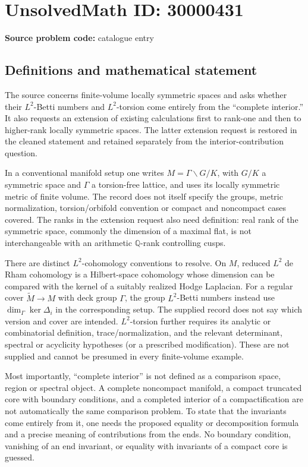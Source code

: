 \documentclass[11pt]{article}
\newcommand{\Q}{\mathbb{Q}}
\begin{document}
\section*{UnsolvedMath ID: 30000431}
\textbf{Source problem code:} catalogue entry
\subsection{Definitions and mathematical statement}
The source concerns finite-volume locally symmetric spaces and asks whether their \(L^2\)-Betti numbers and \(L^2\)-torsion come entirely from the ``complete interior.'' It also requests an extension of existing calculations first to rank-one and then to higher-rank locally symmetric spaces. The latter extension request is restored in the cleaned statement and retained separately from the interior-contribution question.

In a conventional manifold setup one writes \(M=\Gamma\backslash G/K\), with \(G/K\) a symmetric space and \(\Gamma\) a torsion-free lattice, and uses its locally symmetric metric of finite volume. The record does not itself specify the groups, metric normalization, torsion/orbifold convention or compact and noncompact cases covered. The ranks in the extension request also need definition: real rank of the symmetric space, commonly the dimension of a maximal flat, is not interchangeable with an arithmetic \(\Q\)-rank controlling cusps.

There are distinct \(L^2\)-cohomology conventions to resolve. On \(M\), reduced \(L^2\) de Rham cohomology is a Hilbert-space cohomology whose dimension can be compared with the kernel of a suitably realized Hodge Laplacian. For a regular cover \(\widetilde M\to M\) with deck group \(\Gamma\), the group \(L^2\)-Betti numbers instead use \(\dim_\Gamma\ker\Delta_i\) in the corresponding setup. The supplied record does not say which version and cover are intended. \(L^2\)-torsion further requires its analytic or combinatorial definition, trace/normalization, and the relevant determinant, spectral or acyclicity hypotheses (or a prescribed modification). These are not supplied and cannot be presumed in every finite-volume example.

Most importantly, ``complete interior'' is not defined as a comparison space, region or spectral object. A complete noncompact manifold, a compact truncated core with boundary conditions, and a completed interior of a compactification are not automatically the same comparison problem. To state that the invariants come entirely from it, one needs the proposed equality or decomposition formula and a precise meaning of contributions from the ends. No boundary condition, vanishing of an end invariant, or equality with invariants of a compact core is guessed.
\end{document}
